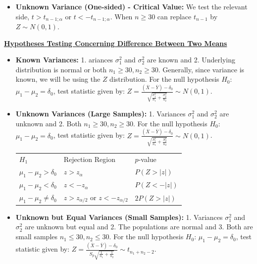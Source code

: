 \documentclass[10pt,landscape]{article}
\begin{document}
\begin{multicols*}{3}
\begin{itemize}[topsep=0pt,noitemsep,wide=0pt, leftmargin=\dimexpr{} + 2\relax]
    \item \textbf{Unknown Variance (One-sided) - Critical Value:} We test the relevant side, $t>t_{n-1;\alpha}$ or $t<-t_{n-1;\alpha}$. When $n \geq 30$ can replace $t_{n-1}$ by $Z \sim N(0, 1)$.
\end{itemize}

\textbf{\underline{Hypotheses Testing Concerning Difference Between Two Means}} \\ 
\begin{itemize}[topsep=0pt,noitemsep,wide=0pt, leftmargin=\dimexpr{} + 2\relax]
    \item \textbf{Known Variances:} 1. ariances $\sigma_1^2$ and $\sigma_2^2$ are known and 2. Underlying distribution is normal or both $n_1≥30, n_2≥30$.
    Generally, since variance is known, we will be using the $Z$ distribution.
    For the null hypothesis $H_0$: $\mu_1 - \mu_2 = \delta_0$, test statistic given by: $Z = \frac{(\overline{X} - \overline{Y}) - \delta_0}{\sqrt{\frac{\sigma_1^2}{n_1} + \frac{\sigma_2^2}{n_2}}} \sim N(0, 1)$.

    \item \textbf{Unknown Variances (Large Samples):} 1. Variances $\sigma_1^2$ and $\sigma_2^2$ are unknown and 2. Both $n_1≥30, n_2≥30$.
    For the null hypothesis $H_0$: $\mu_1 - \mu_2 = \delta_0$, test statistic given by: $Z = \frac{(\overline{X} - \overline{Y}) - \delta_0}{\sqrt{\frac{S_1^2}{n_1} + \frac{S_2^2}{n_2}}} \sim N(0, 1)$.

    {
        \centering
        \begin{tabular}{|l|l|l|}
        \cline{1-3}
        $H_1$                           & Rejection Region                             & $p$-value         \\ \cline{1-3}
        $\mu_1 - \mu_2 > \delta_0$      & $z > z_{\alpha}$                             & $P(Z > |z|)$      \\ \cline{1-3}
        $\mu_1 - \mu_2 < \delta_0$      & $z < -z_{\alpha}$                            & $P(Z < -|z|)$     \\ \cline{1-3}
        $\mu_1 - \mu_2 \neq \delta_0$   & $z > z_{\alpha/2}$ or $z < -z_{\alpha/2}$    & $2P(Z > |z|)$     \\ \cline{1-3}
        \end{tabular}\par
    }   

    \item \textbf{Unknown but Equal Variances (Small Samples):} 1. Variances $\sigma_1^2$ and $\sigma_2^2$ are unknown but equal and 2. The populations are normal and 3. Both are small samples $n_1≤30, n_2≤30$.
    For the null hypothesis $H_0$: $\mu_1 - \mu_2 = \delta_0$, test statistic given by: $Z = \frac{(\overline{X} - \overline{Y}) - \delta_0}{S_p \sqrt{\frac{1}{n_1} + \frac{1}{n_2}}} \sim t_{n_1 + n_2 - 2}$.
\end{itemize}


\end{multicols*}
\end{document}

